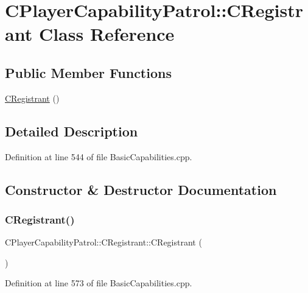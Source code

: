 \hypertarget{classCPlayerCapabilityPatrol_1_1CRegistrant}{}\section{C\+Player\+Capability\+Patrol\+:\+:C\+Registrant Class Reference}
\label{classCPlayerCapabilityPatrol_1_1CRegistrant}
\subsection*{Public Member Functions}
\begin{DoxyCompactItemize}
\item 
\hyperlink{classCPlayerCapabilityPatrol_1_1CRegistrant_a30363f71e5aeed45f3953729b07829ac}{C\+Registrant} ()
\end{DoxyCompactItemize}


\subsection{Detailed Description}


Definition at line 544 of file Basic\+Capabilities.\+cpp.



\subsection{Constructor \& Destructor Documentation}
\hypertarget{classCPlayerCapabilityPatrol_1_1CRegistrant_a30363f71e5aeed45f3953729b07829ac}{}\label{classCPlayerCapabilityPatrol_1_1CRegistrant_a30363f71e5aeed45f3953729b07829ac} 
\subsubsection{\texorpdfstring{C\+Registrant()}{CRegistrant()}}
{\footnotesize\ttfamily C\+Player\+Capability\+Patrol\+::\+C\+Registrant\+::\+C\+Registrant (\begin{DoxyParamCaption}{ }\end{DoxyParamCaption})}



Definition at line 573 of file Basic\+Capabilities.\+cpp.


